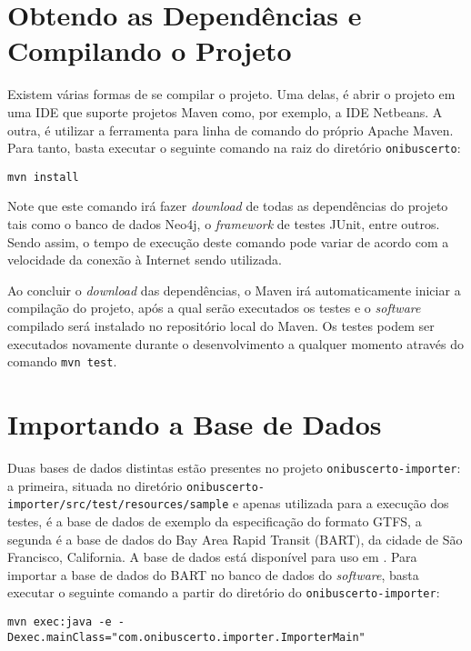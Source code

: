 \section{Obtendo as Dependências e Compilando o Projeto}

Existem várias formas de se compilar o projeto.
Uma delas, é abrir o projeto em uma IDE que suporte projetos Maven como, por exemplo, a IDE Netbeans.
A outra, é utilizar a ferramenta para linha de comando do próprio Apache Maven.
Para tanto, basta executar o seguinte comando na raiz do diretório \texttt{onibuscerto}:

\lstset{language=bash}
\begin{lstlisting}
mvn install
\end{lstlisting}

Note que este comando irá fazer \emph{download} de todas as dependências do projeto tais como o banco de dados Neo4j, o \emph{framework} de testes JUnit, entre outros.
Sendo assim, o tempo de execução deste comando pode variar de acordo com a velocidade da conexão à Internet sendo utilizada.

Ao concluir o \emph{download} das dependências, o Maven irá automaticamente iniciar a compilação do projeto, após a qual serão executados os testes e o \emph{software} compilado será instalado no repositório local do Maven.
Os testes podem ser executados novamente durante o desenvolvimento a qualquer momento através do comando \texttt{mvn test}.

\section{Importando a Base de Dados}

Duas bases de dados distintas estão presentes no projeto \texttt{onibuscerto-importer}: a primeira, situada no diretório \texttt{onibuscerto-importer/src/test/resources/sample} e apenas utilizada para a execução dos testes, é a base de dados de exemplo da especificação do formato GTFS, a segunda é a base de dados do Bay Area Rapid Transit (BART), da cidade de São Francisco, California.
A base de dados está disponível para uso em .
Para importar a base de dados do BART no banco de dados do \emph{software}, basta executar o seguinte comando a partir do diretório do \texttt{onibuscerto-importer}:

\lstset{language=bash}
\begin{lstlisting}
mvn exec:java -e -Dexec.mainClass="com.onibuscerto.importer.ImporterMain"
\end{lstlisting}

